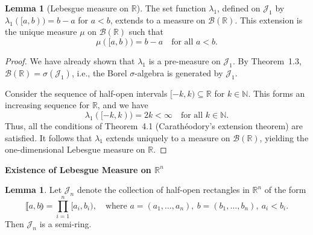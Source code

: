 \documentclass[12pt]{article}
\theoremstyle{definition}
\newtheorem{lemma}[theorem]{Lemma}
\begin{document}
\medskip
\begin{lemma}[Lebesgue measure on $\mathbb{R}$]
The set function $\lambda_1$, defined on $\mathcal{J}_1$ by $\lambda_1([a,b)) = b - a$ for $a < b$, extends to a measure on $\mathcal{B}(\mathbb{R})$. This extension is the unique measure $\mu$ on $\mathcal{B}(\mathbb{R})$ such that
\[
\mu([a,b)) = b - a \quad \text{for all } a < b.
\]
\end{lemma}

\begin{proof}
We have already shown that $\lambda_1$ is a pre-measure on $\mathcal{J}_1$. By Theorem~1.3, $\mathcal{B}(\mathbb{R}) = \sigma(\mathcal{J}_1)$, i.e., the Borel $\sigma$-algebra is generated by $\mathcal{J}_1$. 

Consider the sequence of half-open intervals $[-k, k) \subseteq \mathbb{R}$ for $k \in \mathbb{N}$. This forms an increasing sequence for $\mathbb{R}$, and we have
\[
\lambda_1([-k,k)) = 2k < \infty \quad \text{for all } k \in \mathbb{N}.
\]
Thus, all the conditions of Theorem~4.1 (Carathéodory's extension theorem) are satisfied. It follows that $\lambda_1$ extends uniquely to a measure on $\mathcal{B}(\mathbb{R})$,
yielding the one-dimensional Lebesgue measure on $\mathbb{R}$.
\end{proof}

\medskip
\begin{center}
\textbf{Existence of Lebesgue Measure on \( \mathbb{R}^n \)}
\end{center}

\begin{lemma}
Let \( \mathcal{J}_n \) denote the collection of half-open rectangles in \( \mathbb{R}^n \) of the form
\[
\llbracket a, b \rrparenthesis = \prod_{i=1}^n [a_i, b_i),
\quad \text{where } a = (a_1, \dots, a_n),\ b = (b_1, \dots, b_n),\ a_i < b_i.
\]
Then \( \mathcal{J}_n \) is a semi-ring.
\end{lemma}
\end{document}
